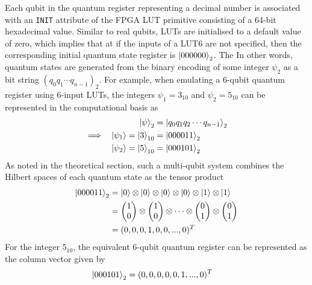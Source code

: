 Each qubit in the quantum register representing a decimal number is associated with an \texttt{INIT} attribute of the FPGA LUT primitive consisting of a 64-bit hexadecimal value. Similar to real qubits, LUTs are initialised to a default value of zero, which implies that at if the inputs of a LUT6 are not specified, then the corresponding initial quantum state register is $\ket{000000}_2$. The  In other words, quantum states are generated from the binary encoding of some integer $\psi_{2}$ as a bit string $(q_0 q_1 \cdots q_{n-1})_2$. For example, when emulating a $6$-qubit quantum register using 6-input LUTs, the integers $\psi_1 = 3_{10}$ and $\psi_2 = 5_{10}$ can be represented in the computational basis as 
\begin{align}
	\ket{\psi}_{2}	& = \ket{q_0 q_1 q_2 \cdots q_{n-1}}_2\nonumber\\
\implies~~	\ket{\psi_1} = \ket{3}_{10} & = \ket{000011}_2 \nonumber\\
	\ket{\psi_2} = \ket{5}_{10}	& = \ket{000101}_2\nonumber
\end{align} 
As noted in the theoretical section, such a multi-qubit system combines the Hilbert spaces of each quantum state as the tensor product
\begin{align}
	\ket{000011}_2	& = \ket{0}\otimes\ket{0}\otimes\ket{0}\otimes\ket{0}\otimes\ket{1}\otimes\ket{1}\nonumber\\
				& = \left(\begin{matrix}
					1\\
					0
				\end{matrix}\right)\otimes\left(\begin{matrix}
				1\\
				0
			\end{matrix}\right)\otimes\cdots\otimes
			\left(\begin{matrix}
				0\\1
			\end{matrix}\right)\otimes
		\left(\begin{matrix}
			0\\1
		\end{matrix}
		\right)\nonumber\\
		& = (0,0,0,1,0,0, ..., 0)^T\nonumber
\end{align}
For the integer $5_{10}$, the equivalent 6-qubit quantum register can be represented as the column vector given by
\begin{align}
	\ket{000101}_2	& = (0,0,0,0,0,1,...,0)^T\nonumber
\end{align}
